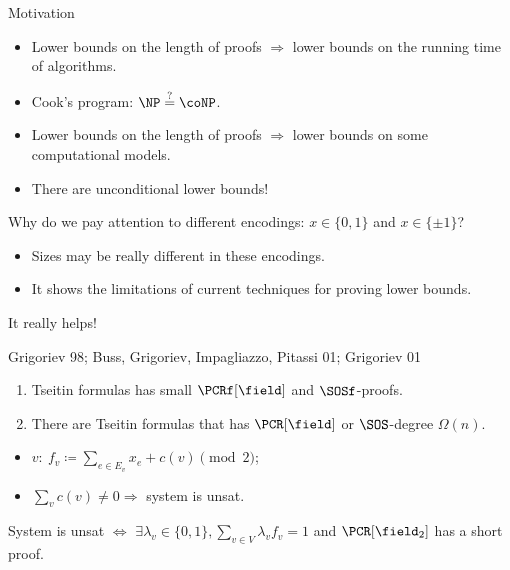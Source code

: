 \begin{frame}{Motivation}

    \pause
    \begin{itemize}
        \item Lower bounds on the length of proofs $\Rightarrow$ lower bounds on the running time of
            algorithms.
            \pause
        \item Cook's program: $\NP \stackrel{?}{=} \coNP$.
            \pause
        \item Lower bounds on the length of proofs $\Rightarrow$ lower bounds on some computational
            models.
            \pause
        \item There are unconditional lower bounds!
    \end{itemize}

    \pause
    \vspace{0.3cm}
    Why do we pay attention to different encodings: $x \in \{0, 1\}$ and $x \in \{\pm 1\}$?
    \pause
    \begin{itemize}
        \item Sizes may be really different in these encodings.
            \pause
        \item It shows the limitations of current techniques for proving lower bounds.
    \end{itemize}
    
\end{frame}

\begin{frame}{It really helps!}

    \begin{block}{Grigoriev 98; Buss, Grigoriev, Impagliazzo, Pitassi 01; Grigoriev 01}
        \begin{enumerate}
            \item Tseitin formulas has small $\PCRf[\field]$ and $\SOSf$-proofs.
            \item There are Tseitin formulas that has $\PCR[\field]$ or $\SOS$-degree $\Omega(n)$.
        \end{enumerate}
    \end{block}

    \begin{minipage}{0.5 \linewidth}
        
    \end{minipage}%
    \begin{minipage}{0.5 \linewidth}
        \pause
        \begin{itemize}
            \item $v\colon ~ f_v \coloneqq \sum\limits_{e \in E_v} x_{e} + c(v) \pmod 2$;
            \item $\sum\limits_{v} c(v) \neq 0 \Rightarrow$ system is unsat. 
        \end{itemize}
    \end{minipage}

    \pause

    System is unsat $\Leftrightarrow$ $\exists \lambda_v \in \{0, 1\}, \sum\limits_{v \in V} \lambda_v
    f_v = 1$ and $\PCR[\field_2]$ has a short proof.
\end{frame}

